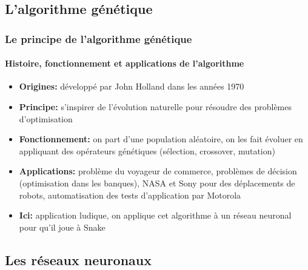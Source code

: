 \documentclass[10pt]{beamer}
\begin{document}
\subsection{L'algorithme génétique}
\begin{frame}
\frametitle{Le principe de l'algorithme génétique}
\framesubtitle{Histoire, fonctionnement et applications de l'algorithme}      
\begin{itemize}
\item \textbf{Origines:} développé par John Holland dans les années 1970
\item \textbf{Principe:} s'inspirer de l'évolution naturelle pour
    résoudre des problèmes d'optimisation
\item \textbf{Fonctionnement:} on part d'une population aléatoire, on les fait évoluer en appliquant des opérateurs
    génétiques (sélection, crossover, mutation)
\item \textbf{Applications:} problème du voyageur de commerce, problèmes de décision (optimisation dans les banques), NASA et Sony pour des déplacements de robots, automatisation des tests d'application par Motorola
    
\item \textbf{Ici:} application ludique, on applique cet algorithme à un réseau neuronal pour qu'il joue à Snake
\end{itemize}  
\end{frame}

\subsection{Les réseaux neuronaux}
\end{document}

